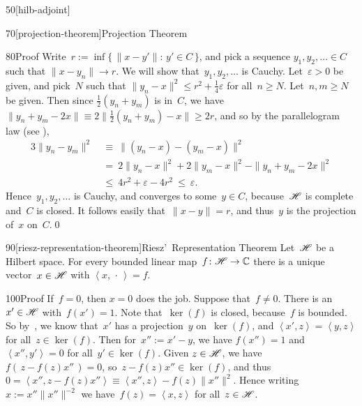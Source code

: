\begin{parsec}{50}[hilb-adjoint]
\begin{point}{70}[projection-theorem]{Projection Theorem}
\begin{point}{80}{Proof}
Write~$r:=\inf\{\,\|x-y'\|\colon\, y'\in C\,\}$,
and pick a sequence $y_1,y_2,\dotsc \in C$
such that $\|x-y_n\|\rightarrow r$.
We will show that~$y_1,y_2,\dotsc$ is Cauchy.
Let~$\varepsilon >0$
be given,
and pick~$N$ such that $\|y_n-x\|^2\leq r^2+\frac{1}{4}\varepsilon$
for all~$n\geq N$.
Let~$n,m\geq N$ be given.
Then since $\frac{1}{2}(y_n+y_m)$
is in~$C$, we have
$\|y_n+y_m-2x\|\equiv 
2\|\frac{1}{2}(y_n+y_m)-x\|\geq 2r$,
and so by the parallelogram law (see ),
\begin{alignat*}{3}
\|y_n-y_m\|^2
\ &\equiv\ 
\|(y_n-x)-(y_m-x)\|^2\\
\ &=\ 
2\|y_n-x\|^2 + 2\|y_m-x\|^2
- \|y_n+y_m-2x\|^2\\
\ &\leq\ 
4r^2 + \varepsilon - 4r^2 \ \leq \ \varepsilon.
\end{alignat*}
Hence~$y_1,y_2,\dotsc$ is Cauchy,
and converges to some~$y\in C$,
because~$\mathscr{H}$ is complete and~$C$ is closed.
It follows easily that~$\|x-y\|=r$,
and thus~$y$ is the projection of~$x$ on~$C$.\qed
\end{point}
\end{point}
\begin{point}{90}[riesz-representation-theorem]{Riesz'~Representation Theorem}%
%
Let~$\mathscr{H}$ be a Hilbert space.
For every bounded linear map~$f\colon \mathscr{H}\to\mathbb{C}$
there is a unique vector~$x\in \mathscr{H}$
with $\left<x,\,\cdot\,\right>=f$.
\begin{point}{100}{Proof}%
If~$f=0$, then $x=0$ does the job.
Suppose that~$f\neq 0$.
There is an~$x'\in\mathscr{H}$ with~$f(x')=1$.
Note that~$\ker(f)$ is closed, because~$f$
is bounded.
So by~\sref{projection-theorem},
we know that~$x'$
has a projection~$y$ on~$\ker(f)$,
and $\left<x',z\right>=\left<y,z\right>$
for all~$z\in \ker(f)$.
Then for~$x'':=x'-y$,
we have $f(x'')=1$ and~$\left<x'',y'\right>=0$
for all~$y'\in \ker(f)$.
Given $z\in \mathscr{H}$,
we have $f(\,z-f(z)x''\,)=0$,
so~$z-f(z)x''\in \ker(f)$,
and thus~$0=\left<x'',z-f(z)x''\right>\equiv \left<x'',z\right>-f(z)\|x''\|^2$.
Hence writing $x:=x''\|x''\|^{-2}$
we have~$f(z)=\left<x,z\right>$
for all~$z\in \mathscr{H}$.


\end{point}
\end{point}
\end{parsec}

